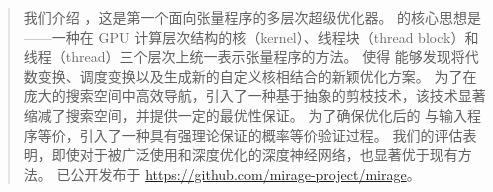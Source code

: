 \begin{abstract}
我们介绍 \sys，这是第一个面向张量程序的多层次超级优化器。
\sys 的核心思想是 \graphs——一种在 GPU 计算层次结构的核（kernel）、线程块（thread block）和线程（thread）三个层次上统一表示张量程序的方法。
\graphs 使得 \sys 能够发现将代数变换、调度变换以及生成新的自定义核相结合的新颖优化方案。
为了在庞大的搜索空间中高效导航，\sys 引入了一种基于抽象的剪枝技术，该技术显著缩减了搜索空间，并提供一定的最优性保证。
为了确保优化后的 \graph 与输入程序等价，\sys 引入了一种具有强理论保证的概率等价验证过程。
我们的评估表明，即使对于被广泛使用和深度优化的深度神经网络，\sys 也显著优于现有方法。
\sys 已公开发布于 \url{https://github.com/mirage-project/mirage}。
\end{abstract}
